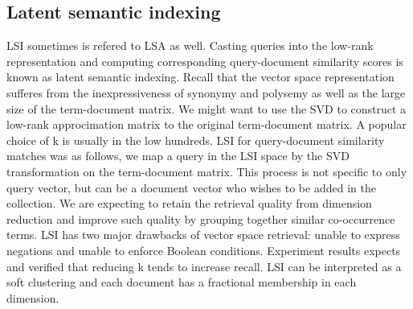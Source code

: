 \documentclass[10pt]{article}
\begin{document}
\subsection{Latent semantic indexing}
LSI sometimes is refered to LSA as well. Casting queries into the low-rank representation and computing corresponding query-document similarity scores is known as latent semantic indexing. Recall that the vector space representation sufferes from the inexpressiveness of synonymy and polysemy as well as the large size of the term-document matrix. We might want to use the SVD to construct a low-rank approcimation matrix to the original term-document matrix. A popular choice of k is usually in the low hundreds. LSI for query-document similarity matches was as follows, we map a query in the LSI space by the SVD transformation on the term-document matrix. This process is not specific to only query vector, but can be a document vector who wishes to be added in the collection. We are expecting to retain the retrieval quality from dimension reduction and improve such quality by grouping together similar co-occurrence terms. LSI has two major drawbacks of vector space retrieval: unable to express negations and unable to enforce Boolean conditions. Experiment results expects and verified that reducing k tends to increase recall. LSI can be interpreted as a soft clustering and each document has a fractional membership in each dimension. 



\end{document}
